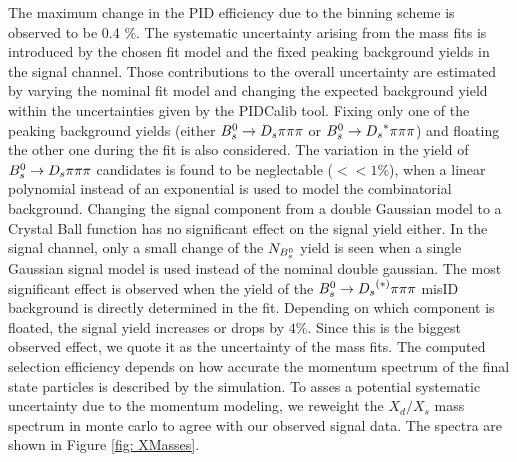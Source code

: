 The maximum change in the PID efficiency due to the binning scheme is observed to be 0.4 $\%$. \newline
The systematic uncertainty arising from the mass fits is introduced by the chosen fit model and the fixed peaking background yields in the signal channel. 
Those contributions to the overall uncertainty are estimated by varying the nominal fit model and changing the expected background yield within the uncertainties given by the PIDCalib tool. 
Fixing only one of the peaking background yields (either ${{B}^0_{s}}\rightarrow{\ensuremath{{D}_{s}}}{\ensuremath{\pi}}{\ensuremath{\pi}}{\ensuremath{\pi}}$ or ${{B}^0_{s}}\rightarrow{\ensuremath{{D}_{s}}}^{*}{\pi}{\pi}{\pi}$) and floating the other one during the fit is also considered.
The variation in the yield of ${{B}^0_{s}}\rightarrow{\ensuremath{{D}_{s}}}{\ensuremath{\pi}}{\ensuremath{\pi}}{\ensuremath{\pi}}$ candidates is found to be neglectable ($<< 1 \%$), when a linear polynomial instead of an exponential is used to model the combinatorial background. 
Changing the signal component from a double Gaussian model to a Crystal Ball function has no significant effect on the signal yield either. 
In the signal channel, only a small change of the $N_{{{B}^0_{s}}}$ yield is seen when a single Gaussian signal model is used instead of the nominal double gaussian. 
The most significant effect is observed when the yield of the ${{B}^0_{s}}\rightarrow{\ensuremath{{D}_{s}}}^{(*)}{\pi}{\pi}{\pi}$ misID background is directly determined in the fit. 
Depending on which component is floated, the signal yield increases or drops by $4 \%$. Since this is the biggest observed effect, we quote it as the uncertainty of the mass fits. \newline
The computed selection efficiency depends on how accurate the momentum spectrum of the final state particles is described by the simulation. 
To asses a potential systematic uncertainty due to the momentum modeling, we reweight the $X_{d}/X_{s}$ mass spectrum in monte carlo to agree with our observed signal data. The spectra are shown in Figure \ref{fig: XMasses}.

